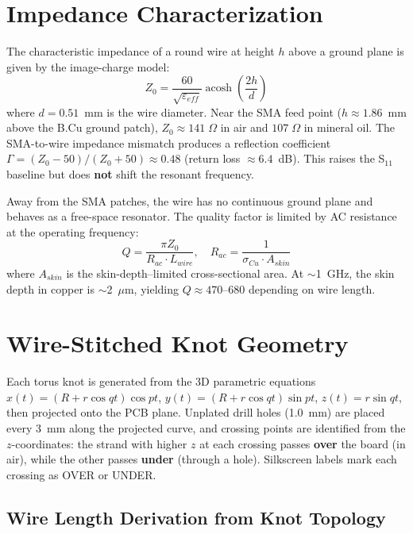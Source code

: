 \section{Impedance Characterization}

The characteristic impedance of a round wire at height $h$ above a ground plane is given by the image-charge model:
\begin{equation}
    Z_0 = \frac{60}{\sqrt{\varepsilon_{eff}}} \operatorname{acosh}\!\left(\frac{2h}{d}\right)
    \label{eq:z0_wire}
\end{equation}
where $d = 0.51$~mm is the wire diameter. Near the SMA feed point ($h \approx 1.86$~mm above the B.Cu ground patch), $Z_0 \approx 141\;\Omega$ in air and $107\;\Omega$ in mineral oil. The SMA-to-wire impedance mismatch produces a reflection coefficient $\Gamma = (Z_0 - 50)/(Z_0 + 50) \approx 0.48$ (return loss $\approx 6.4$~dB). This raises the S$_{11}$ baseline but does \textbf{not} shift the resonant frequency.

Away from the SMA patches, the wire has no continuous ground plane and behaves as a free-space resonator. The quality factor is limited by AC resistance at the operating frequency:
\begin{equation}
    Q = \frac{\pi Z_0}{R_{ac} \cdot L_{wire}}, \quad R_{ac} = \frac{1}{\sigma_{Cu} \cdot A_{skin}}
\end{equation}
where $A_{skin}$ is the skin-depth--limited cross-sectional area. At $\sim$1~GHz, the skin depth in copper is $\sim$2~$\mu$m, yielding $Q \approx 470$--$680$ depending on wire length.

\section{Wire-Stitched Knot Geometry}

Each torus knot is generated from the 3D parametric equations $x(t) = (R + r\cos qt)\cos pt$, $y(t) = (R + r\cos qt)\sin pt$, $z(t) = r\sin qt$, then projected onto the PCB plane. Unplated drill holes (1.0~mm) are placed every 3~mm along the projected curve, and crossing points are identified from the $z$-coordinates: the strand with higher $z$ at each crossing passes \textbf{over} the board (in air), while the other passes \textbf{under} (through a hole). Silkscreen labels mark each crossing as OVER or UNDER.

\subsection{Wire Length Derivation from Knot Topology}

